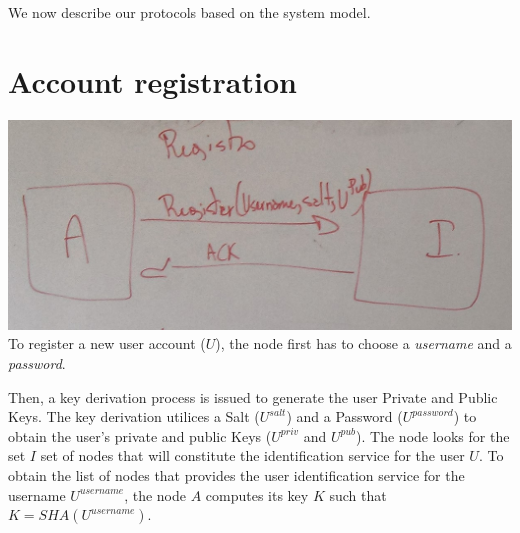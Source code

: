 We now describe our protocols based on the system model. 

\section{Account registration}
\includegraphics[width=14cm]{../img/registration_protocol_mockup.png}\\

To register a new user account ($U$), the node first
has to choose a \textit{username} and a \textit{password}.
% 
% 

Then, a key derivation process is issued to generate the user Private and
Public Keys. The
key derivation utilices a Salt ($U^{salt}$) and a Password ($U^{password}$) to
obtain the user's private and public Keys
($U^{priv}$ and $U^{pub}$).
The node  looks for the set $I$ set of nodes that will constitute the
identification service for the user $U$. To obtain the list of nodes that provides the user identification service for
the username $U^{username}$, the node $A$ computes its key $K$ such that $K =
SHA(U^{username})$. 

